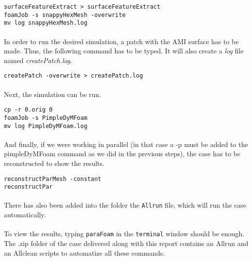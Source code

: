 \begin{center}
\texttt{surfaceFeatureExtract > surfaceFeatureExtract \\
foamJob -s snappyHexMesh -overwrite\\
mv log snappyHexMesh.log }
\end{center}

\paragraph{}In order to run the desired simulation, a patch with the AMI surface has to be made. Thus, the following command has to be typed. It will also create a \textit{log} file named \textit{createPatch.log}.

\begin{center}
\texttt{createPatch -overwrite > createPatch.log}
\end{center}

\paragraph{}Next, the simulation can be run.

\begin{center}
\texttt{cp -r 0.orig 0\\
foamJob -s PimpleDyMFoam\\
mv log PimpleDyMFoam.log}
\end{center}

\paragraph{}And finally, if we were working in parallel (in that case a -p must be added to the pimpleDyMFoam command as we did in the previous steps), the case has to be reconstructed to show the results.

\begin{center}
\texttt{reconstructParMesh -constant\\
reconstructPar}
\end{center}

\paragraph{}There has also been added into the folder the \texttt{Allrun} file, which will run the case automatically.

\paragraph{}To view the results, typing \texttt{paraFoam} in the \texttt{terminal} window should be enough. The .zip folder of the case delivered along with this report contains an Allrun and an Allclean scripts to automatize all these commands.